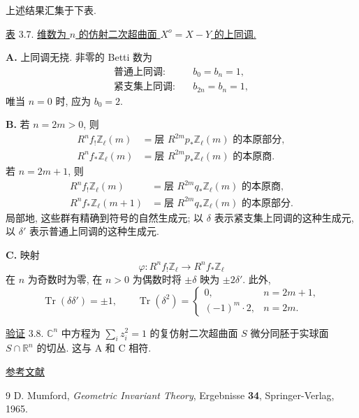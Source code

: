 
上述结果汇集于下表.

\underline{表} 3.7. \underline{维数为 $n$ 的仿射二次超曲面 $X^o=X-Y$ 的上同调.}

\medskip
\noindent\textbf{A.} 上同调无挠. 非零的 Betti 数为
\begin{align*}
\text{普通上同调:}\quad &b_0=b_n=1,\\
\text{紧支集上同调:}\quad &b_{2n}=b_n=1,
\end{align*}
唯当 $n=0$ 时, 应为 $b_0=2$.

\medskip
\noindent\textbf{B.} 若 $n=2m>0$, 则
\begin{align*}
R^nf_!\mathbb Z_\ell(m)
  &=\text{层 }R^{2m}p_*\mathbb Z_\ell(m)\text{ 的本原部分},\\
R^nf_*\mathbb Z_\ell(m)
  &=\text{层 }R^{2m}p_*\mathbb Z_\ell(m)\text{ 的本原商}.
\end{align*}
若 $n=2m+1$, 则
\begin{align*}
R^nf_!\mathbb Z_\ell(m)
  &=\text{层 }R^{2m}q_*\mathbb Z_\ell(m)\text{ 的本原商},\\
R^nf_*\mathbb Z_\ell(m+1)
  &=\text{层 }R^{2m}q_*\mathbb Z_\ell(m)\text{ 的本原部分}.
\end{align*}
局部地, 这些群有精确到符号的自然生成元; 以 $\delta$ 表示紧支集上同调的这种生成元, 以 $\delta'$ 表示普通上同调的这种生成元.

\medskip
\noindent\textbf{C.} 映射
\begin{equation*}
\varphi:R^nf_!\mathbb Z_\ell\longrightarrow R^nf_*\mathbb Z_\ell
\end{equation*}
在 $n$ 为奇数时为零, 在 $n>0$ 为偶数时将 $\pm\delta$ 映为 $\pm2\delta'$. 此外,
\begin{equation*}
\operatorname{Tr}(\delta\delta')=\pm1,
\qquad
\operatorname{Tr}(\delta^2)=
\begin{cases}
0, & n=2m+1,\\
(-1)^m\cdot2, & n=2m.
\end{cases}
\end{equation*}

\underline{验证} 3.8. $\mathbb C^n$ 中方程为 $\sum_i z_i^2=1$ 的复仿射二次超曲面 $S$ 微分同胚于实球面 $S\cap\mathbb R^n$ 的切丛. 这与 A 和 C 相符.

\medskip
\underline{参考文献}

\begin{thebibliography}{9}
D. Mumford, \emph{Geometric Invariant Theory}, Ergebnisse \textbf{34},
Springer-Verlag, 1965.
\end{thebibliography}
